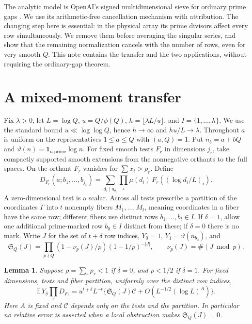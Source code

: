 \documentclass[11pt]{article}
\newtheorem{lemma}[theorem]{Lemma}
\newcommand{\E}{\mathbb E}
\newcommand{\Sg}{\mathfrak S}
\newcommand{\ind}{\mathbf 1}
\begin{document}
The analytic model is OpenAI's signed multidimensional sieve for
ordinary prime gaps \cite{OAI}. We use its arithmetic-free
cancellation mechanism with attribution. The changing step here is
essential: in the physical array its prime divisors affect every row
simultaneously. We remove them before averaging the singular series,
and show that the remaining normalization cancels with the number of
rows, even for very smooth $Q$. This note contains the transfer and
the two applications, without requiring the ordinary-gap theorem.

\section{A mixed-moment transfer}
Fix $\lambda>0$, let $L=\log Q$, $u=Q/\phi(Q)$,
$h=\lfloor\lambda L/u\rfloor$, and $I=\{1,\ldots,h\}$. We use the
standard bound $u\ll\log\log Q$, hence $h\to\infty$ and $hu/L\to\lambda$.
Throughout $a$ is uniform on the representatives $1\le a\le Q$ with
$(a,Q)=1$. Put $n_b=a+bQ$ and $\vartheta(n)=\ind_{n\;\mathrm{prime}}\log n$.
For fixed smooth tests $F_r$ in dimensions $j_r$, take compactly
supported smooth extensions from the nonnegative orthants to the full
spaces. On the orthant $F_r$ vanishes for $\sum x_i>\rho_r$. Define
\[
 D_{F_r}(a;b_1,\ldots,b_{j_r})=
 \sum_{d_i\mid n_{b_i}}\prod_i\mu(d_i)\,
 F_r((\log d_i/L)_i).
\]
A zero-dimensional test is a scalar. Across all tests prescribe a
partition of the coordinates $\Gamma$ into $t$ nonempty fibers
$M_1,\dots,M_t$, meaning coordinates in a fiber have the same row;
different fibers use distinct rows $b_1,\dots,b_t\in I$.
If $\delta=1$, allow one additional prime-marked row $b_0\in I$
distinct from these; if $\delta=0$ there is no mark. Write $J$ for
the set of $t+\delta$ row indices, $Y_0=1$, $Y_1=\vartheta(n_{b_0})$,
and
\[
 \Sg_Q(J)=\prod_{p\nmid Q}
 (1-\nu_p(J)/p)(1-1/p)^{-|J|},\qquad
 \nu_p(J)=\#(J\bmod p).
\]
\begin{lemma}\label{mixed}
Suppose $\rho=\sum_r\rho_r<1$ if $\delta=0$, and $\rho<1/2$ if
$\delta=1$. For fixed dimensions, tests and fiber partition, uniformly
over the distinct row indices,
\[
 \E\,Y_\delta\prod_r D_{F_r}
 =u^{t+\delta}L^{-t}
 \big\{\Sg_Q(J)\mathcal C+O(L^{-1/2}(\log L)^A)\big\}.
\]
Here $A$ is fixed and $\mathcal C$ depends only on the tests and
the partition. In particular no relative error is asserted when a local
obstruction makes $\Sg_Q(J)=0$.
\end{lemma}
\end{document}
